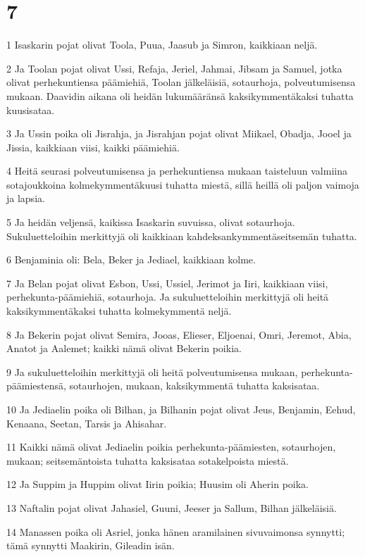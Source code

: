 \chapter{7}

\par 1 Isaskarin pojat olivat Toola, Puua, Jaasub ja Simron, kaikkiaan neljä.
\par 2 Ja Toolan pojat olivat Ussi, Refaja, Jeriel, Jahmai, Jibsam ja Samuel, jotka olivat perhekuntiensa päämiehiä, Toolan jälkeläisiä, sotaurhoja, polveutumisensa mukaan. Daavidin aikana oli heidän lukumääränsä kaksikymmentäkaksi tuhatta kuusisataa.
\par 3 Ja Ussin poika oli Jisrahja, ja Jisrahjan pojat olivat Miikael, Obadja, Jooel ja Jissia, kaikkiaan viisi, kaikki päämiehiä.
\par 4 Heitä seurasi polveutumisensa ja perhekuntiensa mukaan taisteluun valmiina sotajoukkoina kolmekymmentäkuusi tuhatta miestä, sillä heillä oli paljon vaimoja ja lapsia.
\par 5 Ja heidän veljensä, kaikissa Isaskarin suvuissa, olivat sotaurhoja. Sukuluetteloihin merkittyjä oli kaikkiaan kahdeksankymmentäseitsemän tuhatta.
\par 6 Benjaminia oli: Bela, Beker ja Jediael, kaikkiaan kolme.
\par 7 Ja Belan pojat olivat Esbon, Ussi, Ussiel, Jerimot ja Iiri, kaikkiaan viisi, perhekunta-päämiehiä, sotaurhoja. Ja sukuluetteloihin merkittyjä oli heitä kaksikymmentäkaksi tuhatta kolmekymmentä neljä.
\par 8 Ja Bekerin pojat olivat Semira, Jooas, Elieser, Eljoenai, Omri, Jeremot, Abia, Anatot ja Aalemet; kaikki nämä olivat Bekerin poikia.
\par 9 Ja sukuluetteloihin merkittyjä oli heitä polveutumisensa mukaan, perhekunta-päämiestensä, sotaurhojen, mukaan, kaksikymmentä tuhatta kaksisataa.
\par 10 Ja Jediaelin poika oli Bilhan, ja Bilhanin pojat olivat Jeus, Benjamin, Eehud, Kenaana, Seetan, Tarsis ja Ahisahar.
\par 11 Kaikki nämä olivat Jediaelin poikia perhekunta-päämiesten, sotaurhojen, mukaan; seitsemäntoista tuhatta kaksisataa sotakelpoista miestä.
\par 12 Ja Suppim ja Huppim olivat Iirin poikia; Huusim oli Aherin poika.
\par 13 Naftalin pojat olivat Jahasiel, Guuni, Jeeser ja Sallum, Bilhan jälkeläisiä.
\par 14 Manassen poika oli Asriel, jonka hänen aramilainen sivuvaimonsa synnytti; tämä synnytti Maakirin, Gileadin isän.

